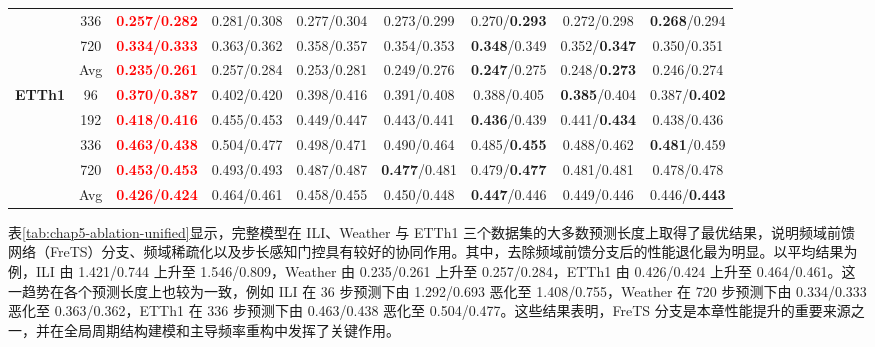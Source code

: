 \begin{table}[!htbp]
{\begin{tabular}{c|c|c|c|c|c|c|c|c}
& 336 & \textbf{\textcolor{red}{0.257/0.282}} & 0.281/0.308 & 0.277/0.304 & 0.273/0.299 & 0.270/\textbf{0.293} & 0.272/0.298 & \textbf{0.268}/0.294 \\
& 720 & \textbf{\textcolor{red}{0.334/0.333}} & 0.363/0.362 & 0.358/0.357 & 0.354/0.353 & \textbf{0.348}/0.349 & 0.352/\textbf{0.347} & 0.350/0.351 \\
& Avg & \textbf{\textcolor{red}{0.235/0.261}} & 0.257/0.284 & 0.253/0.281 & 0.249/0.276 & \textbf{0.247}/0.275 & 0.248/\textbf{0.273} & 0.246/0.274 \\
\midrule
\multirow{5}{*}{\textbf{ETTh1}} & 96 & \textbf{\textcolor{red}{0.370/0.387}} & 0.402/0.420 & 0.398/0.416 & 0.391/0.408 & 0.388/0.405 & \textbf{0.385}/0.404 & 0.387/\textbf{0.402} \\
& 192 & \textbf{\textcolor{red}{0.418/0.416}} & 0.455/0.453 & 0.449/0.447 & 0.443/0.441 & \textbf{0.436}/0.439 & 0.441/\textbf{0.434} & 0.438/0.436 \\
& 336 & \textbf{\textcolor{red}{0.463/0.438}} & 0.504/0.477 & 0.498/0.471 & 0.490/0.464 & 0.485/\textbf{0.455} & 0.488/0.462 & \textbf{0.481}/0.459 \\
& 720 & \textbf{\textcolor{red}{0.453/0.453}} & 0.493/0.493 & 0.487/0.487 & \textbf{0.477}/0.481 & 0.479/\textbf{0.477} & 0.481/0.481 & 0.478/0.478 \\
& Avg & \textbf{\textcolor{red}{0.426/0.424}} & 0.464/0.461 & 0.458/0.455 & 0.450/0.448 & \textbf{0.447}/0.446 & 0.449/0.446 & 0.446/\textbf{0.443} \\
\bottomrule
\end{tabular}
}
\end{table} 表\ref{tab:chap5-ablation-unified}显示，完整模型在 ILI、Weather 与 ETTh1 三个数据集的大多数预测长度上取得了最优结果，说明频域前馈网络（FreTS）分支、频域稀疏化以及步长感知门控具有较好的协同作用。其中，去除频域前馈分支后的性能退化最为明显。以平均结果为例，ILI 由 1.421/0.744 上升至 1.546/0.809，Weather 由 0.235/0.261 上升至 0.257/0.284，ETTh1 由 0.426/0.424 上升至 0.464/0.461。这一趋势在各个预测长度上也较为一致，例如 ILI 在 36 步预测下由 1.292/0.693 恶化至 1.408/0.755，Weather 在 720 步预测下由 0.334/0.333 恶化至 0.363/0.362，ETTh1 在 336 步预测下由 0.463/0.438 恶化至 0.504/0.477。这些结果表明，FreTS 分支是本章性能提升的重要来源之一，并在全局周期结构建模和主导频率重构中发挥了关键作用。

